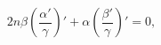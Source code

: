 \begin{equation}
2n\beta \left(\frac{\alpha'}{\gamma}\right)' + \alpha
\left(\frac{\beta'}{\gamma}\right)'=0,
\end{equation}

